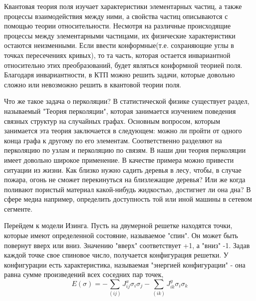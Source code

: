 \documentclass[12pt,a4paper]{article}
\begin{document}
	\par Квантовая теория поля изучает характеристики элементарных частиц, а также процессы взаимодействия между ними, а свойства частиц описываются с помощью теории относительности. Несмотря на различные происходящие процессы между элементарными частицами, их физические характеристики остаются неизменными. Если ввести конформные(т.е. сохраняющие углы в точках пересечениях кривых), то та часть, которая остается инвариантной относительно этих преобразований, будет являться конформной теорией поля. Благодаря инвариантности, в КТП можно решить задачи, которые довольно сложно или невозможно решить в квантовой теории поля.
	
	\par Что же такое задача о перколяции? В статистической физике существует раздел, называемый "Теория перколяции", которая занимается изучением поведения связных структур на случайных графах. Основным вопросом, которым занимается эта теория заключается в следующем: можно ли пройти от одного конца графа к другому по его элементам. Соответственно разделяют на перколяцию по узлам и перколяцию по связям. В наши дни теория перколяции имеет довольно широкое применение. В качестве примера можно привести ситуации из жизни. Как близко нужно садить деревья в лесу, чтобы, в случае пожара, огонь не сможет перекинуться на близлежащие деревья? Или же когда поливают пористый материал какой-нибудь жидкостью, достигнет ли она дна? В сфере медиа например, определить доступность той или иной машины в сетевом сегменте.
	
	\par Перейдем к модели Изинга. Пусть на двумерной решетке находятся точки, которые имеют определенной состояние, называемое "спин". Он может быть повернут вверх или вниз. Значению "вверх" соответствует +1, а "вниз" -1. Задав каждой точке свое спиновое число, получается конфигурация решетки. У конфигурации есть характеристика, называемая "энергией конфигурации" - она равна сумме произведений всех соседних пар точек,
	\begin{equation}\label{conf_energy}
		E({\sigma}) = - \sum_{(ij)}J_{ij}^{x}\sigma_{i}\sigma_{j} -\sum_{(ik)}J_{ik}^{y}\sigma_{i}\sigma_{k}
	\end{equation}
	
\end{document}
